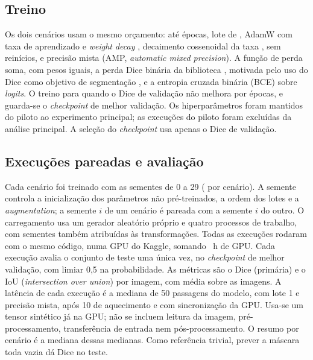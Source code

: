 \documentclass[conference]{IEEEtran}
\begin{document}
\subsection{Treino}
Os dois cenários usam o mesmo orçamento: até \MaxEpochs{} épocas, lote de \BatchSize{}, AdamW
\cite{loshchilov2019adamw} com taxa de aprendizado \LR{} e \textit{weight decay} \WeightDecay{},
decaimento cossenoidal da taxa \cite{loshchilov2017sgdr}, sem reinícios, e precisão mista
(AMP, \textit{automatic mixed precision}).
A função de perda soma, com pesos iguais, a perda Dice binária da biblioteca
\cite{iakubovskii2019smp}, motivada pelo uso do Dice como objetivo de segmentação
\cite{milletari2016vnet}, e a entropia cruzada binária (BCE) sobre \textit{logits}. O treino para quando
o Dice de validação não melhora por \Patience{} épocas, e guarda-se o \textit{checkpoint} de
melhor validação. Os hiperparâmetros foram mantidos do piloto ao experimento principal;
as execuções do piloto foram excluídas da análise principal. A seleção do
\textit{checkpoint} usa apenas o Dice de validação.

\subsection{Execuções pareadas e avaliação}
Cada cenário foi treinado com as sementes de 0 a 29 (\NPairs{} por cenário). A semente controla
a inicialização dos parâmetros não pré-treinados, a ordem dos lotes e a \textit{augmentation};
a semente $i$ de um cenário é pareada com a semente $i$ do outro. O carregamento usa um
gerador aleatório próprio e quatro processos de trabalho, com sementes também atribuídas
às transformações. Todas as execuções rodaram com o mesmo código, numa GPU
\LatDevice{} do Kaggle, somando \GPUHours{}~h de GPU. Cada execução avalia o conjunto de teste
uma única vez, no \textit{checkpoint} de melhor validação, com limiar 0,5 na probabilidade. As
métricas são o Dice (primária) e o IoU (\textit{intersection over union}) por imagem, com média sobre as \NTest{} imagens. A
latência de cada execução é a mediana de 50 passagens do modelo, com lote 1 e precisão mista,
após 10 de aquecimento e com sincronização da GPU. Usa-se um tensor sintético já na GPU;
não se incluem leitura da imagem, pré-processamento, transferência de entrada nem
pós-processamento. O resumo por cenário é a mediana dessas medianas. Como referência
trivial, prever a máscara toda vazia dá Dice \ZeroDice{} no teste.
\end{document}
